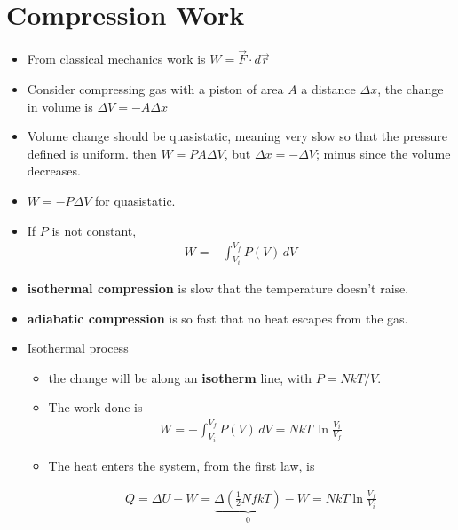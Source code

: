 \documentclass{book}
\begin{document}
\section{Compression Work}%
\label{sec:Compression Work}

\begin{itemize}
	\item From classical mechanics work is $W = \vec{F} \cdot d\vec{r}$
	\item  Consider compressing gas with a piston of area $A$ a distance $\Delta{x}$,
	      the change in volume is $\Delta{V} = -A \Delta{x}$
	\item Volume change should be quasistatic, meaning very slow so that the pressure defined is uniform.
	      then $W = P A \Delta{V}$, but $\Delta{x} = - \Delta{V}$; minus since the volume decreases.
	\item $W =- P \Delta{V}$  for  quasistatic.
	\item If $P$ is not constant,
	      \begin{align}
		      \label{eq:gas work}
		      W = - \int_{V_i}^{V_f} P(V) \, dV
	      \end{align}

	\item \textbf{isothermal compression} is slow that the temperature doesn't raise.
	\item \textbf{adiabatic compression} is so fast that no heat escapes from the gas.
	\item Isothermal process
	      \begin{itemize}
		      \item  the change will be along an \textbf{ isotherm } line,
		            with $P = NkT / V$.
		      \item The work done is
		            \begin{align}
			            W  = - \int_{V_i}^{V_f} P(V) \, dV = NkT \, \ln{ \frac{V_{i}}{V_{f}} }
		            \end{align}
		      \item The heat enters the system, from the first law, is

		            \begin{align}
			            Q = \Delta{U} - W = \underbrace{ \Delta{( \frac{1}{2}NfkT )} }_{0} - W = NkT \ln{\frac{V_{f}}{V_{i}}}
		            \end{align}
	      \end{itemize}


\end{itemize}
\end{document}
